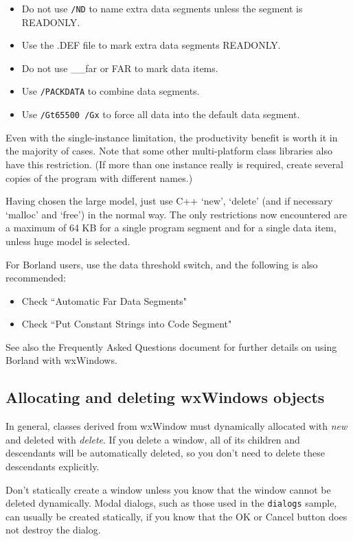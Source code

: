 \begin{itemize}\itemsep=0pt
\item Do not use {\tt /ND} to name extra data segments unless the segment is READONLY.
\item Use the .DEF file to mark extra data segments READONLY.
\item Do not use \_\_far or FAR to mark data items.
\item Use {\tt /PACKDATA} to combine data segments.
\item Use {\tt /Gt65500 /Gx} to force all data into the default data segment.
\end{itemize}

Even with the single-instance limitation, the productivity benefit is
worth it in the majority of cases. Note that some other multi-platform
class libraries also have this restriction. (If more than one instance
really is required, create several copies of the program with different
names.)

Having chosen the large model, just use C++ `new', `delete' (and if
necessary `malloc' and `free') in the normal way. The only restrictions
now encountered are a maximum of 64 KB for a single program segment and
for a single data item, unless huge model is selected.

For Borland users, use the data threshold switch, and the following is
also recommended:

\begin{itemize}\itemsep=0pt
\item Check ``Automatic Far Data Segments"
\item Check ``Put Constant Strings into Code Segment"
\end{itemize}

See also the Frequently Asked Questions document for further details
on using Borland with wxWindows.

\subsection{Allocating and deleting wxWindows objects}

In general, classes derived from wxWindow must dynamically allocated
with {\it new} and deleted with {\it delete}. If you delete a window,
all of its children and descendants will be automatically deleted,
so you don't need to delete these descendants explicitly.

Don't statically create a window unless you know that the window
cannot be deleted dynamically. Modal dialogs, such as those used
in the {\tt dialogs} sample, can usually be created statically,
if you know that the OK or Cancel button does not destroy the dialog.

